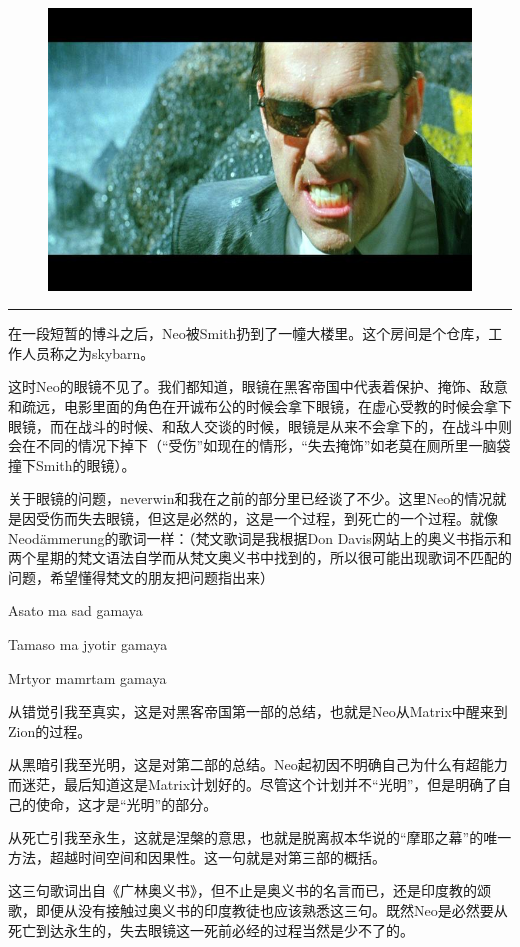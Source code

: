 \documentclass[UTF8]{ctexart}
\newcommand{\myparsep}{\noindent \rule[0.5ex]{\linewidth}{1pt}}
\newenvironment{myquote}{\color{green} \setlength{\leftskip}{6em} \setlength{\rightskip}{4em} \setlength{\parindent}{-2em}}{\par}
\begin{document}
\begin{figure}[htb]
\centering
\includegraphics[width=0.5\linewidth]{fig/ea5c6609c9fb42ce3ac7634d.jpg}
\end{figure}

\myparsep

在一段短暂的博斗之后，Neo被Smith扔到了一幢大楼里。这个房间是个仓库，工作人员称之为skybarn。

这时Neo的眼镜不见了。我们都知道，眼镜在黑客帝国中代表着保护、掩饰、敌意和疏远，电影里面的角色在开诚布公的时候会拿下眼镜，在虚心受教的时候会拿下眼镜，而在战斗的时候、和敌人交谈的时候，眼镜是从来不会拿下的，在战斗中则会在不同的情况下掉下（“受伤”如现在的情形，“失去掩饰”如老莫在厕所里一脑袋撞下Smith的眼镜）。

关于眼镜的问题，neverwin和我在之前的部分里已经谈了不少。这里Neo的情况就是因受伤而失去眼镜，但这是必然的，这是一个过程，到死亡的一个过程。就像Neodämmerung的歌词一样：（梵文歌词是我根据Don Davis网站上的奥义书指示和两个星期的梵文语法自学而从梵文奥义书中找到的，所以很可能出现歌词不匹配的问题，希望懂得梵文的朋友把问题指出来）

\begin{myquote}
Asato ma sad gamaya

Tamaso ma jyotir gamaya

Mrtyor mamrtam gamaya
\end{myquote}

从错觉引我至真实，这是对黑客帝国第一部的总结，也就是Neo从Matrix中醒来到Zion的过程。

从黑暗引我至光明，这是对第二部的总结。Neo起初因不明确自己为什么有超能力而迷茫，最后知道这是Matrix计划好的。尽管这个计划并不“光明”，但是明确了自己的使命，这才是“光明”的部分。

从死亡引我至永生，这就是涅槃的意思，也就是脱离叔本华说的“摩耶之幕”的唯一方法，超越时间空间和因果性。这一句就是对第三部的概括。

这三句歌词出自《广林奥义书》，但不止是奥义书的名言而已，还是印度教的颂歌，即便从没有接触过奥义书的印度教徒也应该熟悉这三句。既然Neo是必然要从死亡到达永生的，失去眼镜这一死前必经的过程当然是少不了的。
\end{document}
